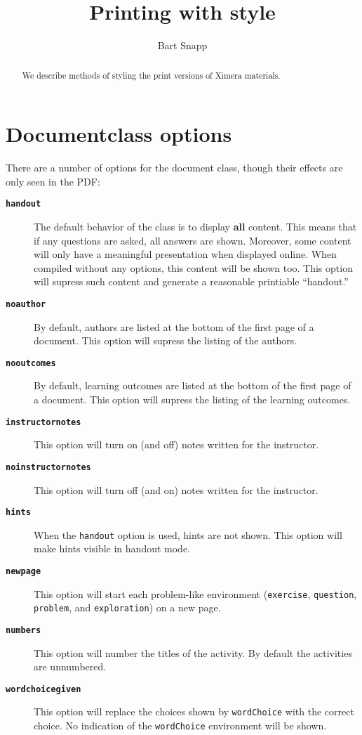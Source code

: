 \documentclass{ximera}
\title{Printing with style}
\author{Bart Snapp}
\begin{document}
\begin{abstract}
    We describe methods of styling the print versions of Ximera materials.
\end{abstract}
\maketitle

\section{Documentclass options}

There are a number of options for the document class, though their
effects are only seen in the PDF:

\begin{description}
    \item[\tt\bfseries handout] The default behavior of the class is to display
        \textbf{all} content. This means that if any questions are asked, all
        answers
        are shown. Moreover, some content will only have a meaningful
        presentation when
        displayed online. When compiled without any options, this content will
        be shown
        too. This option will supress such content and generate a reasonable
        printiable
        ``handout.''
    \item[\tt\bfseries noauthor] By default, authors are listed at the bottom
        of
        the first page of a document. This option will supress the listing of
        the
        authors.
    \item[\tt\bfseries nooutcomes] By default, learning outcomes are listed at
        the
        bottom of the first page of a document. This option will supress the
        listing of
        the learning outcomes.
    \item[\tt\bfseries instructornotes] This option will turn on (and off)
        notes
        written for the instructor.
    \item[\tt\bfseries noinstructornotes] This option will turn off (and on)
        notes
        written for the instructor.
    \item[\tt\bfseries hints] When the \texttt{handout} option is used, hints
        are
        not shown. This option will make hints visible in handout mode.
    \item[\tt\bfseries newpage] This option will start each problem-like
        environment (\texttt{exercise}, \texttt{question}, \texttt{problem},
        and
        \texttt{exploration}) on a new page.
    \item[\tt\bfseries numbers] This option will number the titles of the
        activity.
        By default the activities are unnumbered.
    \item[\tt\bfseries wordchoicegiven] This option will replace the choices
        shown
        by \texttt{wordChoice} with the correct choice. No indication of the
        \texttt{wordChoice} environment will be shown.
\end{description}
\end{document}
